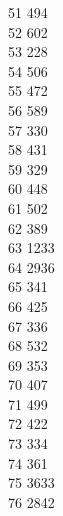 { 51	494 \\
 52	602 \\
 53	228 \\
 54	506 \\
 55	472 \\
 56	589 \\
 57	330 \\
 58	431 \\
 59	329 \\
 60	448 \\
 61	502 \\
 62	389 \\
 63	1233 \\
 64	2936 \\
 65	341 \\
 66	425 \\
 67	336 \\
 68	532 \\
 69	353 \\
 70	407 \\
 71	499 \\
 72	422 \\
 73	334 \\
 74	361 \\
 75	3633 \\
 76	2842 \\
}
